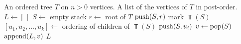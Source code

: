 
\begin{algorithmic}[1]
\Require An ordered tree $T$ on $n > 0$ vertices.
\Ensure A list of the vertices of $T$ in post-order.
\State $L \gets [\,]$
\State $S \gets$ empty stack
\State $r \gets$ root of $T$
\State $\operatorname*{push}(S, r)$
    \State mark $\Top(S)$
    \State $[u_1, u_2, \dots, u_k] \gets$ ordering of children of $\Top(S)$
      \State $\operatorname*{push}(S, u_i)$
    \EndFor
  \Else
    \State $v \gets \operatorname*{pop}(S)$
    \State $\operatorname*{append}(L, v)$
  \EndIf
\EndWhile
\State \Return $L$
\end{algorithmic}
